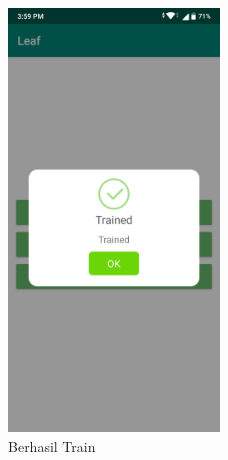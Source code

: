 \begin{figure}[ht]
	\centering\includegraphics[width=0.5\textwidth]{bab5/figures/trained.png}
	\caption{Berhasil Train}
	\label{fig:train}
\end{figure}


